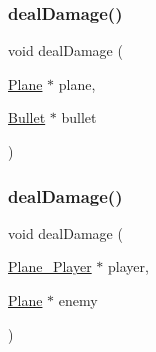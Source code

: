 \subsubsection{\texorpdfstring{deal\+Damage()}{dealDamage()}\hspace{0.1cm}{\footnotesize\ttfamily [1/2]}}
{\footnotesize\ttfamily void deal\+Damage (\begin{DoxyParamCaption}\item[{\hyperlink{class_plane}{Plane} $\ast$}]{plane,  }\item[{\hyperlink{class_bullet}{Bullet} $\ast$}]{bullet }\end{DoxyParamCaption})}

\mbox{\label{_plane_01-_01_bullet_8h_ab0e76936bbaa057d4f15ddf206b75b91}} 
\subsubsection{\texorpdfstring{deal\+Damage()}{dealDamage()}\hspace{0.1cm}{\footnotesize\ttfamily [2/2]}}
{\footnotesize\ttfamily void deal\+Damage (\begin{DoxyParamCaption}\item[{\hyperlink{class_plane___player}{Plane\+\_\+\+Player} $\ast$}]{player,  }\item[{\hyperlink{class_plane}{Plane} $\ast$}]{enemy }\end{DoxyParamCaption})}


